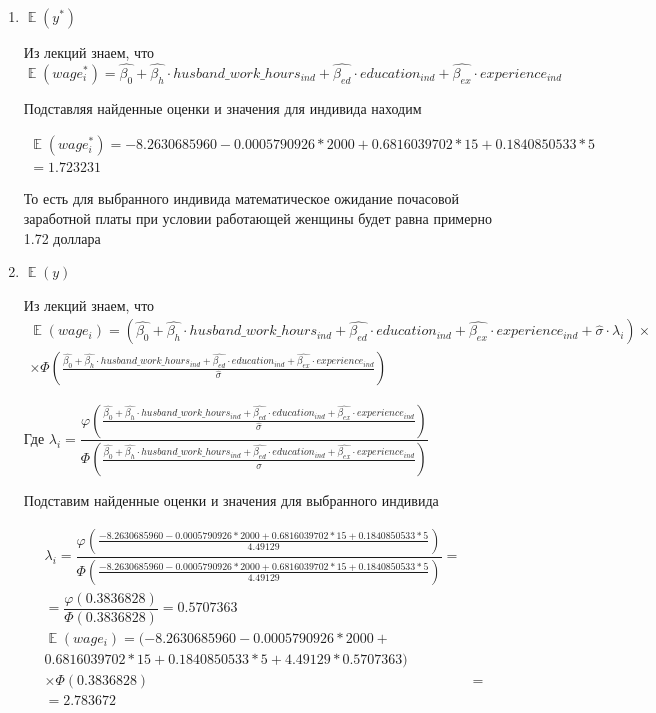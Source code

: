 \documentclass[a4paper,12pt]{article}
\DeclareMathOperator{\EX}{\mathbb{E}}%
\begin{document}
\begin{enumerate}[label=\Alph*)]
	\item $\EX(y^*)$
	
	Из лекций знаем, что $\EX(wage_i^*) = \hat{\beta_0}+\hat{\beta_h} \cdot husband\_work\_hours_{ind}  +\hat{\beta_{ed} }\cdot education_{ind}+ \hat{\beta_{ex} }\cdot experience_{ind}$
	
	Подставляя найденные оценки и значения для индивида находим
	
	\begin{align*}
		\EX(wage_i^*) = -8.2630685960 -0.0005790926*2000+  0.6816039702*15  +0.1840850533 *5 \\= 1.723231
	\end{align*}
	
	То есть для выбранного индивида математическое ожидание почасовой заработной платы при условии работающей женщины будет равна примерно 1.72 доллара
	
	\item $\EX(y)$
	
	Из лекций знаем, что 
	\begin{align*}
	\EX(wage_i) = (\hat{\beta_0}+\hat{\beta_h} \cdot husband\_work\_hours_{ind}  +\hat{\beta_{ed} }\cdot education_{ind}+ \hat{\beta_{ex} }\cdot experience_{ind}+\hat{\sigma}\cdot \lambda_i) \times \\ \times \Phi \left(\frac{\hat{\beta_0}+\hat{\beta_h} \cdot husband\_work\_hours_{ind}  +\hat{\beta_{ed} }\cdot education_{ind}+ \hat{\beta_{ex} }\cdot experience_{ind}}{\hat{\sigma}}\right)
	\end{align*}

	Где $\lambda_i = \dfrac{\varphi\left(\frac{\hat{\beta_0}+\hat{\beta_h} \cdot husband\_work\_hours_{ind}  +\hat{\beta_{ed} }\cdot education_{ind}+ \hat{\beta_{ex} }\cdot experience_{ind}}{\hat{\sigma}}\right)}{\Phi \left(\frac{\hat{\beta_0}+\hat{\beta_h} \cdot husband\_work\_hours_{ind}  +\hat{\beta_{ed} }\cdot education_{ind}+ \hat{\beta_{ex} }\cdot experience_{ind}}{\hat{\sigma}}\right)}$
	
	Подставим найденные оценки и значения для выбранного индивида
	
	\begin{align*}
		\lambda_i  = \dfrac{\varphi\left(\frac{-8.2630685960 -0.0005790926*2000+  0.6816039702*15  +0.1840850533 *5}{4.49129}\right)}{\Phi\left(\frac{-8.2630685960 -0.0005790926*2000+  0.6816039702*15  +0.1840850533 *5}{4.49129}\right)} =\\
		=\dfrac{\varphi(0.3836828 )}{\Phi(0.3836828 )} = 0.5707363\\
	\EX(wage_i) = (-8.2630685960 -0.0005790926*2000+  \\0.6816039702*15  +0.1840850533 *5 + 4.49129*0.5707363)\\ \times\Phi(0.3836828 ) &=\\
		=2.783672
	\end{align*}
	

\end{enumerate}
\end{document}
